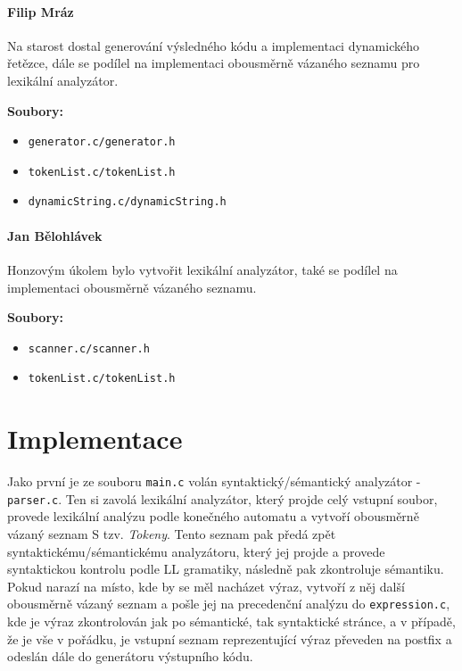 \documentclass[czech,a4paper,12pt]{article}[]
\begin{document}
    \paragraph{Filip Mráz}
        \begin{inpar}
            Na starost dostal generování výsledného kódu a implementaci dynamického řetězce, dále se podílel na implementaci obousměrně vázaného seznamu pro lexikální analyzátor.
    
            \medskip
            \textbf{Soubory:}
            \begin{itemize}
                \item \texttt{generator.c/generator.h}
                \item \texttt{tokenList.c/tokenList.h}
                \item \texttt{dynamicString.c/dynamicString.h}
            \end{itemize}
        \end{inpar}
    \paragraph{Jan Bělohlávek}
        \begin{inpar}
            Honzovým úkolem bylo vytvořit lexikální analyzátor, také se podílel na implementaci obousměrně vázaného seznamu.

            \medskip
            \textbf{Soubory:}
            \begin{itemize}
                \item \texttt{scanner.c/scanner.h}
                \item \texttt{tokenList.c/tokenList.h}
            \end{itemize}
        \end{inpar}

    
    \newpage
    \section{Implementace}
    Jako první je ze souboru \texttt{main.c} volán syntaktický/sémantický analyzátor - \texttt{parser.c}. Ten si zavolá lexikální analyzátor, který projde celý vstupní soubor, provede lexikální analýzu podle konečného automatu a vytvoří obousměrně vázaný seznam S tzv. \emph{Tokeny}. Tento seznam pak předá zpět syntaktickému/sémantickému analyzátoru, který jej projde a provede syntaktickou kontrolu podle LL gramatiky, následně pak zkontroluje sémantiku. Pokud narazí na místo, kde by se měl nacházet výraz, vytvoří z něj další obousměrně vázaný seznam a pošle jej na precedenční analýzu do \texttt{expression.c}, kde je výraz zkontrolován jak po sémantické, tak syntaktické stránce, a v případě, že je vše v pořádku, je vstupní seznam reprezentující výraz převeden na postfix a odeslán dále do generátoru výstupního kódu. 
\end{document}
